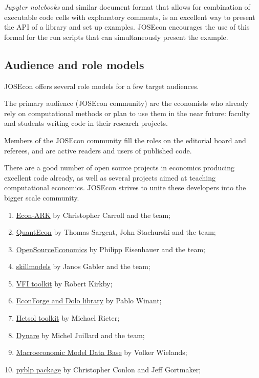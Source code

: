 \emph{Jupyter notebooks} and similar document format that allows for combination of executable 
code cells with explanatory comments, is an excellent way to present the API of a library and set
up examples. 
JOSEcon encourages the use of this formal for the run scripts that can simultaneously present 
the example.


\subsection{Audience and role models}

JOSEcon offers several role models for a few target audiences.

The primary audience (JOSEcon community) are the economists who already rely on computational
methods or plan to use them in the near future: faculty and students writing code in their 
research projects.

Members of the JOSEcon community fill the roles on the editorial board and referees, and are
active readers and users of published code.

There are a good number of open source projects in economics producing excellent code already, 
as well as several projects aimed at teaching computational economics.
JOSEcon strives to unite these developers into the bigger scale community.

\begin{enumerate}
\item \href{https://econ-ark.org/}{Econ-ARK} by Christopher Carroll and the team;
\item \href{https://quantecon.org/}{QuantEcon} by Thomas Sargent, John Stachurski and the team;
\item \href{https://github.com/OpenSourceEconomics}{OpenSourceEconomics} by Philipp Eisenhauer and the team;
\item \href{https://github.com/janosg/skillmodels}{skillmodels} by Janos Gabler and the team;
\item \href{http://www.vfitoolkit.com/}{VFI toolkit} by Robert Kirkby;
\item \href{https://github.com/EconForge}{EconForge and Dolo library} by Pablo Winant;
\item \href{}{Hetsol toolkit} by Michael Rieter;
\item \href{https://www.dynare.org}{Dynare} by Michel Juillard and the team;
\item \href{http://www.macromodelbase.com}{Macroeconomic Model Data Base} by Volker Wielands;
\item \href{https://pypi.org/project/pyblp/}{pyblp package} by Christopher Conlon and Jeff Gortmaker;
\end{enumerate}

